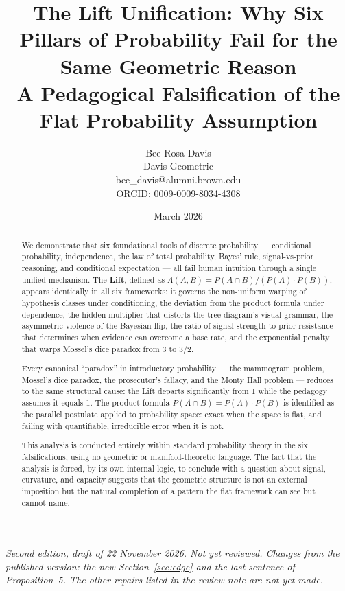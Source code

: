 \documentclass[12pt]{article}
\title{\textbf{The Lift Unification: Why Six Pillars of Probability Fail for the Same Geometric Reason}\\[12pt]
\large A Pedagogical Falsification of the Flat Probability Assumption}
\author{Bee Rosa Davis\\
{\small Davis Geometric}\\
{\small bee\_davis@alumni.brown.edu}\\
{\small ORCID: 0009-0009-8034-4308}}
\date{March 2026}
\begin{document}
\maketitle

{\small\noindent\textit{Second edition, draft of 22 November 2026. Not yet reviewed. Changes from the published version: the new Section~\ref{sec:edge} and the last sentence of Proposition~5. The other repairs listed in the review note are not yet made.}\par}

\begin{abstract}
We demonstrate that six foundational tools of discrete probability --- conditional probability, independence, the law of total probability, Bayes' rule, signal-vs-prior reasoning, and conditional expectation --- all fail human intuition through a single unified mechanism. The \textbf{Lift}, defined as $\Lambda(A,B) = P(A \cap B) / (P(A) \cdot P(B))$, appears identically in all six frameworks: it governs the non-uniform warping of hypothesis classes under conditioning, the deviation from the product formula under dependence, the hidden multiplier that distorts the tree diagram's visual grammar, the asymmetric violence of the Bayesian flip, the ratio of signal strength to prior resistance that determines when evidence can overcome a base rate, and the exponential penalty that warps Mossel's dice paradox from 3 to $3/2$.

Every canonical ``paradox'' in introductory probability --- the mammogram problem, Mossel's dice paradox, the prosecutor's fallacy, and the Monty Hall problem --- reduces to the same structural cause: the Lift departs significantly from 1 while the pedagogy assumes it equals 1. The product formula $P(A \cap B) = P(A) \cdot P(B)$ is identified as the parallel postulate applied to probability space: exact when the space is flat, and failing with quantifiable, irreducible error when it is not.

This analysis is conducted entirely within standard probability theory in the six falsifications, using no geometric or manifold-theoretic language. The fact that the analysis is forced, by its own internal logic, to conclude with a question about signal, curvature, and capacity suggests that the geometric structure is not an external imposition but the natural completion of a pattern the flat framework can see but cannot name.
\end{abstract}

\tableofcontents
\end{document}
